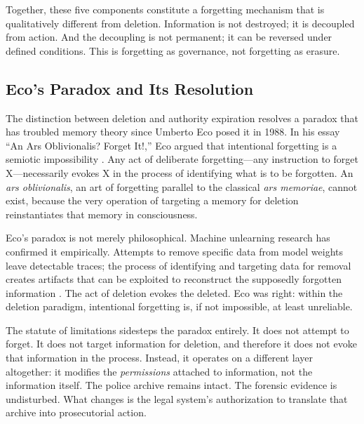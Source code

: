 \documentclass[12pt]{article}
\begin{document}
Together, these five components constitute a forgetting mechanism that is qualitatively different from deletion. Information is not destroyed; it is decoupled from action. And the decoupling is not permanent; it can be reversed under defined conditions. This is forgetting as governance, not forgetting as erasure.

\subsection{Eco's Paradox and Its Resolution}
\label{sec:ecos-paradox}

The distinction between deletion and authority expiration resolves a paradox that has troubled memory theory since Umberto Eco posed it in 1988. In his essay ``An Ars Oblivionalis? Forget It!,'' Eco argued that intentional forgetting is a semiotic impossibility \citep{eco-ars-oblivionalis}. Any act of deliberate forgetting---any instruction to forget X---necessarily evokes X in the process of identifying what is to be forgotten. An \emph{ars oblivionalis}, an art of forgetting parallel to the classical \emph{ars memoriae}, cannot exist, because the very operation of targeting a memory for deletion reinstantiates that memory in consciousness.

Eco's paradox is not merely philosophical. Machine unlearning research has confirmed it empirically. Attempts to remove specific data from model weights leave detectable traces; the process of identifying and targeting data for removal creates artifacts that can be exploited to reconstruct the supposedly forgotten information \citep{unlearning-iclr2025}. The act of deletion evokes the deleted. Eco was right: within the deletion paradigm, intentional forgetting is, if not impossible, at least unreliable.

The statute of limitations sidesteps the paradox entirely. It does not attempt to forget. It does not target information for deletion, and therefore it does not evoke that information in the process. Instead, it operates on a different layer altogether: it modifies the \emph{permissions} attached to information, not the information itself. The police archive remains intact. The forensic evidence is undisturbed. What changes is the legal system's authorization to translate that archive into prosecutorial action.
\end{document}
